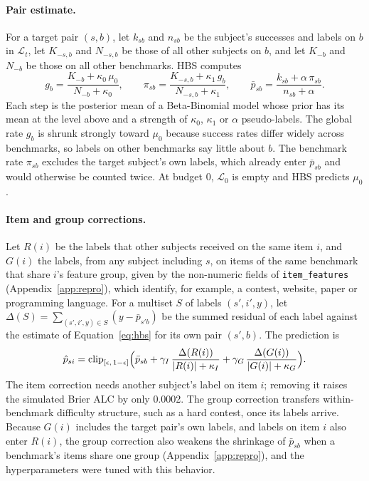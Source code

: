 \documentclass{article}
\begin{document}
\paragraph{Pair estimate.} For a target pair $(s,b)$, let $k_{sb}$ and $n_{sb}$ be the subject's successes and labels on $b$ in $\mathcal{L}_t$, let $K_{-s,b}$ and $N_{-s,b}$ be those of all other subjects on $b$, and let $K_{-b}$ and $N_{-b}$ be those on all other benchmarks. HBS computes
\begin{equation}
  g_b = \frac{K_{-b} + \kappa_0 \, \mu_0}{N_{-b} + \kappa_0}, \qquad
  \pi_{sb} = \frac{K_{-s,b} + \kappa_1 \, g_b}{N_{-s,b} + \kappa_1}, \qquad
  \bar p_{sb} = \frac{k_{sb} + \alpha \, \pi_{sb}}{n_{sb} + \alpha}.
  \label{eq:hbs}
\end{equation}
Each step is the posterior mean of a Beta-Binomial model whose prior has its mean at the level above and a strength of $\kappa_0$, $\kappa_1$ or $\alpha$ pseudo-labels. The global rate $g_b$ is shrunk strongly toward $\mu_0$ because success rates differ widely across benchmarks, so labels on other benchmarks say little about $b$. The benchmark rate $\pi_{sb}$ excludes the target subject's own labels, which already enter $\bar p_{sb}$ and would otherwise be counted twice. At budget 0, $\mathcal{L}_0$ is empty and HBS predicts $\mu_0$.

\paragraph{Item and group corrections.} Let $R(i)$ be the labels that other subjects received on the same item $i$, and $G(i)$ the labels, from any subject including $s$, on items of the same benchmark that share $i$'s feature group, given by the non-numeric fields of \texttt{item\_features} (Appendix~\ref{app:repro}), which identify, for example, a contest, website, paper or programming language. For a multiset $S$ of labels $(s', i', y)$, let $\Delta(S) = \sum_{(s', i', y) \in S} (y - \bar p_{s' b})$ be the summed residual of each label against the estimate of Equation~\eqref{eq:hbs} for its own pair $(s', b)$. The prediction is
\begin{equation}
  \hat p_{si} = \operatorname{clip}_{[\epsilon,\, 1-\epsilon]} \Bigl( \bar p_{sb}
    + \gamma_I \, \frac{\Delta(R(i))}{|R(i)| + \kappa_I}
    + \gamma_G \, \frac{\Delta(G(i))}{|G(i)| + \kappa_G} \Bigr).
  \label{eq:corrections}
\end{equation}
The item correction needs another subject's label on item $i$; removing it raises the simulated Brier ALC by only 0.0002. The group correction transfers within-benchmark difficulty structure, such as a hard contest, once its labels arrive. Because $G(i)$ includes the target pair's own labels, and labels on item $i$ also enter $R(i)$, the group correction also weakens the shrinkage of $\bar p_{sb}$ when a benchmark's items share one group (Appendix~\ref{app:repro}), and the hyperparameters were tuned with this behavior.
\end{document}
